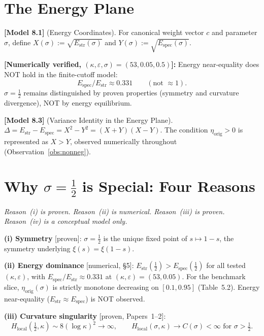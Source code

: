 \documentclass[11pt]{article}
\newcommand{\Estr}{E_{\mathrm{str}}}
\newcommand{\Espec}{E_{\mathrm{spec}}}
\newcommand{\etaorig}{\eta_{\mathrm{orig}}}
\newcommand{\Hlocal}{H_{\mathrm{local}}}
\begin{document}
\section{The Energy Plane}

\textbf{[Model 8.1]} (Energy Coordinates).
For canonical weight vector $c$ and parameter $\sigma$, define
$X(\sigma):=\sqrt{\Estr(\sigma)}$ and $Y(\sigma):=\sqrt{\Espec(\sigma)}$.

\textbf{[Numerically verified, $(\kappa,\varepsilon,\sigma)=(53,0.05,0.5)$]:}
Energy near-equality does NOT hold in the finite-cutoff model:
\[
\Espec/\Estr\approx 0.331\qquad(\text{not }\approx 1).
\]
$\sigma=\tfrac12$ remains distinguished by proven properties (symmetry and
curvature divergence), NOT by energy equilibrium.

\textbf{[Model 8.3]} (Variance Identity in the Energy Plane).
$\Delta=\Estr-\Espec=X^2-Y^2=(X+Y)(X-Y)$.
The condition $\etaorig>0$ is represented as $X>Y$, observed numerically
throughout (Observation~\ref{obs:nonneg}).

\section{Why $\sigma=\tfrac{1}{2}$ is Special: Four Reasons}

\emph{Reason~(i) is proven. Reason~(ii) is numerical. Reason~(iii) is proven.
Reason~(iv) is a conceptual model only.}

\textbf{(i) Symmetry} [proven]:
$\sigma=\tfrac12$ is the unique fixed point of $s\mapsto 1-s$,
the symmetry underlying $\xi(s)=\xi(1-s)$.

\textbf{(ii) Energy dominance} [numerical, \S5]:
$\Estr(\tfrac12)>\Espec(\tfrac12)$ for all tested $(\kappa,\varepsilon)$,
with $\Espec/\Estr\approx 0.331$ at $(\kappa,\varepsilon)=(53,0.05)$.
For the benchmark slice, $\etaorig(\sigma)$ is strictly monotone decreasing
on $[0.1,0.95]$ (Table~5.2). Energy near-equality
($\Estr\approx\Espec$) is NOT observed.

\textbf{(iii) Curvature singularity} [proven, Papers~1--2]:
\[
\Hlocal(\tfrac12,\kappa)\sim 8(\log\kappa)^2\to\infty,\qquad
\Hlocal(\sigma,\kappa)\to C(\sigma)<\infty\text{ for }\sigma>\tfrac12.
\]
\end{document}
